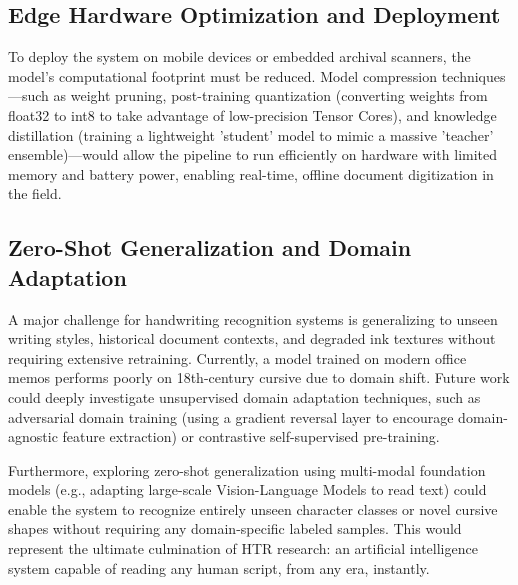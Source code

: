 \subsection{Edge Hardware Optimization and Deployment}
To deploy the system on mobile devices or embedded archival scanners, the model's computational footprint must be reduced. Model compression techniques—such as weight pruning, post-training quantization (converting weights from float32 to int8 to take advantage of low-precision Tensor Cores), and knowledge distillation (training a lightweight 'student' model to mimic a massive 'teacher' ensemble)—would allow the pipeline to run efficiently on hardware with limited memory and battery power, enabling real-time, offline document digitization in the field.

\subsection{Zero-Shot Generalization and Domain Adaptation}
A major challenge for handwriting recognition systems is generalizing to unseen writing styles, historical document contexts, and degraded ink textures without requiring extensive retraining. Currently, a model trained on modern office memos performs poorly on 18th-century cursive due to domain shift. Future work could deeply investigate unsupervised domain adaptation techniques, such as adversarial domain training (using a gradient reversal layer to encourage domain-agnostic feature extraction) or contrastive self-supervised pre-training. 

Furthermore, exploring zero-shot generalization using multi-modal foundation models (e.g., adapting large-scale Vision-Language Models to read text) could enable the system to recognize entirely unseen character classes or novel cursive shapes without requiring any domain-specific labeled samples. This would represent the ultimate culmination of HTR research: an artificial intelligence system capable of reading any human script, from any era, instantly.

